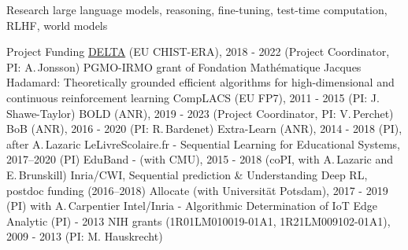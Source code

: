\documentclass{resume}
\begin{document}

\begin{category}{Research}
\citemnobullet  large language models, reasoning, fine-tuning, test-time computation, RLHF, world models\end{category}

\begin{category}{Project Funding}
\citembullet \href{https://www.upf.edu/web/delta}{DELTA} (EU CHIST-ERA), 2018 - 2022  (Project Coordinator, PI: A.\,Jonsson)
\citembullet  PGMO-IRMO grant of Fondation Math\' ematique Jacques Hadamard: Theoretically grounded efficient algorithms for high-dimensional and continuous
reinforcement learning
\citembullet CompLACS (EU FP7), 2011 - 2015 (PI: J.\,Shawe-Taylor)
\citembullet BOLD (ANR), 2019 - 2023  (Project Coordinator, PI: V.\,Perchet)
\citembullet BoB (ANR), 2016 - 2020  (PI: R.\,Bardenet)
\citembullet Extra-Learn (ANR), 2014 - 2018  (PI), after A.\,Lazaric
\citembullet LeLivreScolaire.fr - Sequential Learning for Educational Systems, 2017--2020 (PI)
\citembullet EduBand - (with CMU), 2015 - 2018  (coPI, with A.\,Lazaric and E.\,Brunskill)  
\citembullet Inria/CWI, Sequential prediction \& Understanding Deep RL, postdoc funding (2016--2018)
\citembullet Allocate (with Universit\"{a}t Potsdam), 2017 - 2019  (PI) with A.\,Carpentier  
\citembullet Intel/Inria - Algorithmic Determination of IoT Edge Analytic (PI) -
2013 
\citembullet NIH grants (1R01LM010019-01A1, 1R21LM009102-01A1), 2009 - 
2013 (PI: M. Hauskrecht)
\end{category}
\end{document}

